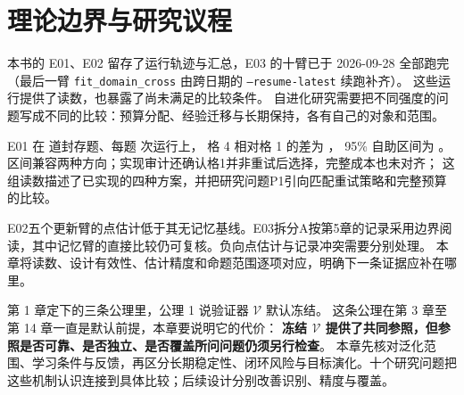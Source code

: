 \chapter{理论边界与研究议程}
\label{ch16}


\begin{failurebox}
本书的 E01、E02 留存了运行轨迹与汇总，E03 的十臂已于 2026-09-28 全部跑完
（最后一臂 \texttt{fit\_domain\_cross} 由跨日期的 \texttt{--resume-latest} 续跑补齐）。
这些运行提供了读数，也暴露了尚未满足的比较条件。
自进化研究需要把不同强度的问题写成不同的比较：预算分配、经验迁移与长期保持，各有自己的对象和范围。

E01 在  道封存题、每题  次运行上，
格 4 相对格 1 的差为 ，
95\% 自助区间为 \measured{$[-0.1000,+0.1750]$}。
区间兼容两种方向；实现审计还确认格1并非重试后选择，完整成本也未对齐；
这组读数描述了已实现的四种方案，并把研究问题P1引向匹配重试策略和完整预算的比较。

E02五个更新臂的点估计低于其无记忆基线。E03拆分A按第5章的记录采用边界阅读，其中记忆臂的直接比较仍可复核。负向点估计与记录冲突需要分别处理。
本章将读数、设计有效性、估计精度和命题范围逐项对应，明确下一条证据应补在哪里。
\end{failurebox}


第 1 章定下的三条公理里，公理 1 说验证器 $\mathcal V$ 默认冻结。
这条公理在第 3 章至第 14 章一直是默认前提，本章要说明它的代价：
\textbf{冻结 $\mathcal V$ 提供了共同参照，但参照是否可靠、是否独立、是否覆盖所问问题仍须另行检查}。
本章先核对泛化范围、学习条件与反馈，再区分长期稳定性、闭环风险与目标演化。十个研究问题把这些机制认识连接到具体比较；后续设计分别改善识别、精度与覆盖。

